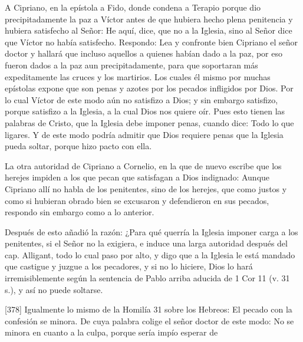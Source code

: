 A Cipriano, en la epístola a Fido, donde condena a Terapio porque dio precipitadamente la paz a Víctor antes de que hubiera hecho plena penitencia y hubiera satisfecho al Señor: He aquí, dice, que no a la Iglesia, sino al Señor dice que Víctor no había satisfecho. Respondo: Lea y confronte bien Cipriano el señor doctor y hallará que incluso aquellos a quienes habían dado a la paz, por eso fueron dados a la paz aun precipitadamente, para que soportaran más expeditamente las cruces y los martirios. Los cuales él mismo por muchas epístolas expone que son penas y azotes por los pecados infligidos por Dios. Por lo cual Víctor de este modo aún no satisfizo a Dios; y sin embargo satisfizo, porque satisfizo a la Iglesia, a la cual Dios nos quiere oír. Pues esto tienen las palabras de Cristo, que la Iglesia debe imponer penas, cuando dice: Todo lo que ligares. Y de este modo podría admitir que Dios requiere penas que la Iglesia pueda soltar, porque hizo pacto con ella.

La otra autoridad de Cipriano a Cornelio, en la que de nuevo escribe que los herejes impiden a los que pecan que satisfagan a Dios indignado: Aunque Cipriano allí no habla de los penitentes, sino de los herejes, que como justos y como si hubieran obrado bien se excusaron y defendieron en sus pecados, respondo sin embargo como a lo anterior.

Después de esto añadió la razón: ¿Para qué querría la Iglesia imponer carga a los penitentes, si el Señor no la exigiera, e induce una larga autoridad después del cap. Alligant, todo lo cual paso por alto, y digo que a la Iglesia le está mandado que castigue y juzgue a los pecadores, y si no lo hiciere, Dios lo hará irremisiblemente según la sentencia de Pablo arriba aducida de 1 Cor 11 (v. 31 s.), y así no puede soltarse.

[378] Igualmente lo mismo de la Homilía 31 sobre los Hebreos: El pecado con la confesión se minora. De cuya palabra colige el señor doctor de este modo: No se minora en cuanto a la culpa, porque sería impío esperar de

